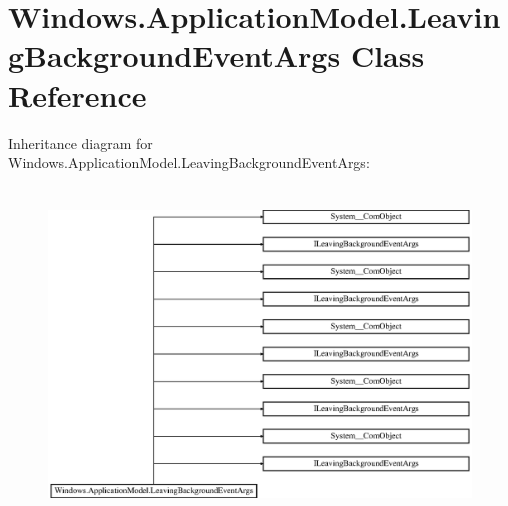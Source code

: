 \hypertarget{class_windows_1_1_application_model_1_1_leaving_background_event_args}{}\section{Windows.\+Application\+Model.\+Leaving\+Background\+Event\+Args Class Reference}
\label{class_windows_1_1_application_model_1_1_leaving_background_event_args}
Inheritance diagram for Windows.\+Application\+Model.\+Leaving\+Background\+Event\+Args\+:\begin{figure}[H]
\begin{center}
\leavevmode
\includegraphics[height=8.850575cm]{class_windows_1_1_application_model_1_1_leaving_background_event_args}
\end{center}
\end{figure}
